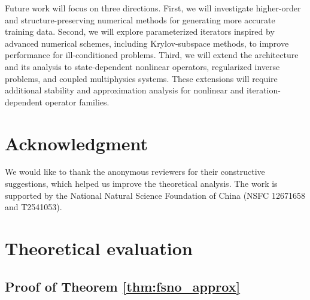 \documentclass[preprint,numbers,sort&compress]{elsarticle}
\begin{document}
			Future work will focus on three directions. First, we will investigate higher-order and structure-preserving numerical methods for generating more accurate training data. Second, we will explore parameterized iterators inspired by advanced numerical schemes, including Krylov-subspace methods, 
			to improve performance for ill-conditioned problems. Third, we will extend the architecture and its analysis to state-dependent nonlinear operators, regularized inverse problems, and coupled multiphysics systems. These extensions will require additional stability and approximation analysis for 
			nonlinear and iteration-dependent operator families.
			
			\section*{Acknowledgment}
			We would like to thank the anonymous reviewers for their constructive suggestions, which helped us improve the theoretical analysis. The work is supported by the National Natural Science Foundation of China (NSFC 12671658 and T2541053). 
			
			
			
			\appendix
			
			\section{Theoretical evaluation}\label{secA1}
			\subsection{Proof of Theorem \ref{thm:fsno_approx}}\label{Them2}
			
\end{document}
